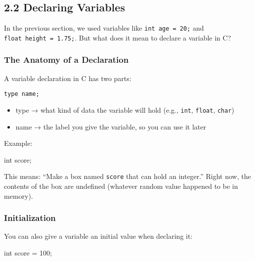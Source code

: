 \documentclass[
  letterpaper,
  DIV=11,
  numbers=noendperiod]{scrreprt}
\newenvironment{Shaded}{\begin{snugshade}}{\end{snugshade}}
\newcommand{\DataTypeTok}[1]{\textcolor[rgb]{0.68,0.00,0.00}{#1}}
\newcommand{\DecValTok}[1]{\textcolor[rgb]{0.68,0.00,0.00}{#1}}
\newcommand{\NormalTok}[1]{\textcolor[rgb]{0.00,0.23,0.31}{#1}}
\newcommand{\OperatorTok}[1]{\textcolor[rgb]{0.37,0.37,0.37}{#1}}
\providecommand{\tightlist}{%
  \setlength{\itemsep}{0pt}\setlength{\parskip}{0pt}}
\begin{document}
\subsection{2.2 Declaring Variables}\label{declaring-variables}

In the previous section, we used variables like
\texttt{int\ age\ =\ 20;} and \texttt{float\ height\ =\ 1.75;}. But what
does it mean to declare a variable in C?

\subsubsection{The Anatomy of a
Declaration}\label{the-anatomy-of-a-declaration}

A variable declaration in C has two parts:

\begin{verbatim}
type name;
\end{verbatim}

\begin{itemize}
\tightlist
\item
  type → what kind of data the variable will hold (e.g., \texttt{int},
  \texttt{float}, \texttt{char})
\item
  name → the label you give the variable, so you can use it later
\end{itemize}

Example:

\begin{Shaded}
\begin{Highlighting}[]
\DataTypeTok{int}\NormalTok{ score}\OperatorTok{;}
\end{Highlighting}
\end{Shaded}

This means: ``Make a box named \texttt{score} that can hold an
integer.'' Right now, the contents of the box are undefined (whatever
random value happened to be in memory).

\subsubsection{Initialization}\label{initialization}

You can also give a variable an initial value when declaring it:

\begin{Shaded}
\begin{Highlighting}[]
\DataTypeTok{int}\NormalTok{ score }\OperatorTok{=} \DecValTok{100}\OperatorTok{;}
\end{Highlighting}
\end{Shaded}
\end{document}
